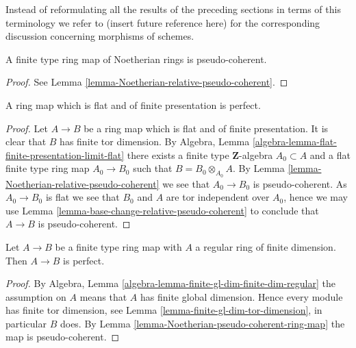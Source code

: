 \noindent
Instead of reformulating all the results of the preceding sections
in terms of this terminology we refer to (insert future reference here)
for the corresponding discussion concerning morphisms of schemes.

\begin{lemma}
\label{lemma-Noetherian-pseudo-coherent-ring-map}
A finite type ring map of Noetherian rings is pseudo-coherent.
\end{lemma}

\begin{proof}
See
Lemma \ref{lemma-Noetherian-relative-pseudo-coherent}.
\end{proof}

\begin{lemma}
\label{lemma-flat-finite-presentation-perfect}
A ring map which is flat and of finite presentation is perfect.
\end{lemma}

\begin{proof}
Let $A \to B$ be a ring map which is flat and of finite presentation.
It is clear that $B$ has finite tor dimension. By
Algebra, Lemma \ref{algebra-lemma-flat-finite-presentation-limit-flat}
there exists a finite type $\mathbf{Z}$-algebra $A_0 \subset A$
and a flat finite type ring map $A_0 \to B_0$ such that
$B = B_0 \otimes_{A_0} A$. By
Lemma \ref{lemma-Noetherian-relative-pseudo-coherent}
we see that $A_0 \to B_0$ is pseudo-coherent.
As $A_0 \to B_0$ is flat we see that $B_0$ and $A$ are tor independent
over $A_0$, hence we may use
Lemma \ref{lemma-base-change-relative-pseudo-coherent}
to conclude that $A \to B$ is pseudo-coherent.
\end{proof}

\begin{lemma}
\label{lemma-regular-perfect-ring-map}
Let $A \to B$ be a finite type ring map with $A$ a regular ring
of finite dimension. Then $A \to B$ is perfect.
\end{lemma}

\begin{proof}
By
Algebra, Lemma \ref{algebra-lemma-finite-gl-dim-finite-dim-regular}
the assumption on $A$ means that $A$ has finite global dimension.
Hence every module has finite tor dimension, see
Lemma \ref{lemma-finite-gl-dim-tor-dimension},
in particular $B$ does. By
Lemma \ref{lemma-Noetherian-pseudo-coherent-ring-map}
the map is pseudo-coherent.
\end{proof}





















